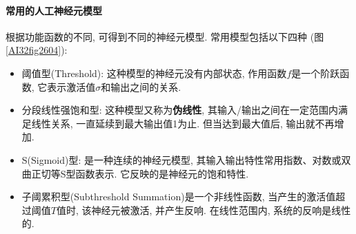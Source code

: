 \paragraph{常用的人工神经元模型}
根据功能函数的不同, 可得到不同的神经元模型. 常用模型包括以下四种 (图 \ref{AI32fig2604}):
\begin{itemize}
\item 阈值型(Threshold): 这种模型的神经元没有内部状态, 作用函数$f$是一个阶跃函数, 它表示激活值$\sigma$和输出之间的关系.
\item 分段线性强饱和型: 这种模型又称为\textbf{伪线性}, 其输入/输出之间在一定范围内满足线性关系, 一直延续到最大输出值1为止. 但当达到最大值后, 输出就不再增加.
\item S(Sigmoid)型: 是一种连续的神经元模型, 其输入输出特性常用指数、对数或双曲正切等S型函数表示. 它反映的是神经元的饱和特性.

\item 子阈累积型(Subthreshold Summation)是一个非线性函数, 当产生的激活值超过阈值$T$值时, 该神经元被激活, 并产生反响. 在线性范围内, 系统的反响是线性的.
\end{itemize}
